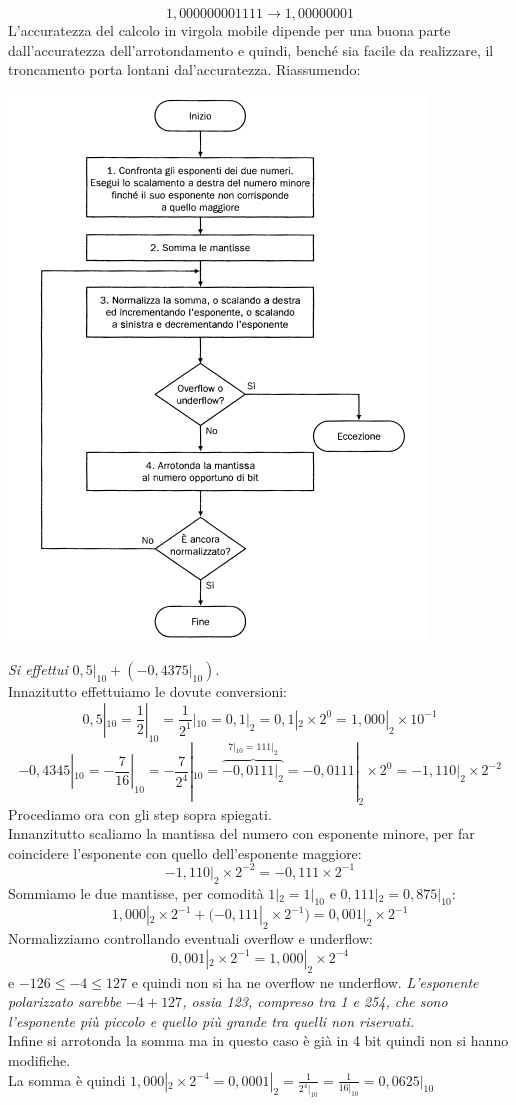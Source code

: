 \documentclass[a4paper,12pt, oneside]{book}
\begin{document}
\[1,000000001111\longrightarrow 1,00000001\]
L'accuratezza del calcolo in virgola mobile dipende per una buona parte dall'accuratezza dell'arrotondamento e quindi, benché sia facile da realizzare, il troncamento porta lontani dal'accuratezza. Riassumendo:
\begin{center}
\includegraphics[scale = 0.60]{img/sum.png}
\end{center}
\begin{esempio}
  \textit{Si effettui} $0,5|_{10}+ (-0,4375|_{10})$.\\
  Innazitutto effettuiamo le dovute conversioni:
  \[0,5|_{10}= \frac{1}{2}|_{10}= \frac{1}{2^1}|_{10}= 0,1|_2 = 0,1|_2 \times 2^0 = 1,000|_2 \times 10^{-1}\]
  \[-0,4345|_{10}=-\frac{7}{16}|_{10}=-\frac{7}{2^4}|_{10}=\overbrace{-0,0111|_2}^{7|_{10} = 111|_2}=-0,0111|_2 \times 2^0 = -1,110|_2 \times 2^{-2}\]
  Procediamo ora con gli step sopra spiegati.\\
  Innanzitutto scaliamo la mantissa del numero con esponente minore, per far coincidere l'esponente con quello dell'esponente maggiore:
  \[-1,110|_2\times 2^{-2} = -0,111 \times 2^{-1}\]
  Sommiamo le due mantisse, per comodità $1|_2=1|_{10}$ e $0,111|_2 = 0,875|_{10}$:
  \[1,000|_2\times 2^{-1}+ (-0,111|_2 \times 2^{-1}) = 0,001|_2\times 2^{-1}\]
  Normalizziamo controllando eventuali overflow e underflow:
  \[0,001|_2\times 2^{-1} = 1,000|_2 \times 2^{-4}\]
  e $-126 \leq -4 \leq 127$ e quindi non si ha ne overflow ne underflow. \textit{L'esponente polarizzato sarebbe $-4+ 127$, ossia 123, compreso tra 1 e 254, che
    sono l'esponente più piccolo e quello più grande tra quelli non riservati.}\\
  Infine si arrotonda la somma ma in questo caso è già in 4 bit quindi non si hanno modifiche.\\
  La somma è quindi $1,000|_2 \times 2^{-4}=0,0001|_2 = \frac{1}{2^4|_{10}} = \frac{1}{16|_{10}}= 0,0625|_{10}$
\end{esempio}
\end{document}
